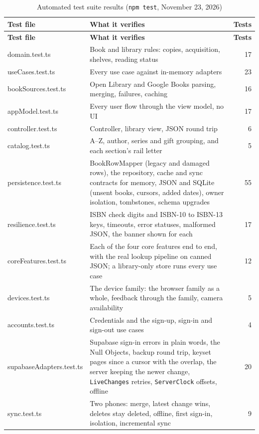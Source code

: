 \documentclass[12pt]{article}
\begin{document}
\begin{longtable}{L{5cm} L{8cm} r}
\caption{Automated test suite results (\texttt{npm test}, November 23, 2026)}
\label{tab:tests} \\
\toprule
\textbf{Test file} & \textbf{What it verifies} & \textbf{Tests} \\
\midrule
\endfirsthead
\toprule
\textbf{Test file} & \textbf{What it verifies} & \textbf{Tests} \\
\midrule
\endhead
domain.test.ts & Book and library rules: copies, acquisition, shelves, reading status & 17 \\
useCases.test.ts & Every use case against in-memory adapters & 23 \\
bookSources.test.ts & Open Library and Google Books parsing, merging, failures, caching & 16 \\
appModel.test.ts & Every user flow through the view model, no UI & 17 \\
controller.test.ts & Controller, library view, JSON round trip & 6 \\
catalog.test.ts & A--Z, author, series and gift grouping, and each section's rail letter & 5 \\
persistence.test.ts & BookRowMapper (legacy and damaged rows), the repository, cache and sync contracts for memory, JSON and SQLite (unsent books, cursors, added dates), owner isolation, tombstones, schema upgrades & 55 \\
resilience.test.ts & ISBN check digits and ISBN-10 to ISBN-13 keys, timeouts, error statuses, malformed JSON, the banner shown for each & 17 \\
coreFeatures.test.ts & Each of the four core features end to end, with the real lookup pipeline on canned JSON; a library-only store runs every use case & 12 \\
devices.test.ts & The device family: the browser family as a whole, feedback through the family, camera availability & 5 \\
accounts.test.ts & Credentials and the sign-up, sign-in and sign-out use cases & 4 \\
supabaseAdapters.test.ts & Supabase sign-in errors in plain words, the Null Objects, backup round trip, keyset pages since a cursor with the overlap, the server keeping the newer change, \texttt{LiveChanges} retries, \texttt{ServerClock} offsets, offline & 20 \\
sync.test.ts & Two phones: merge, latest change wins, deletes stay deleted, offline, first sign-in, isolation, incremental sync & 9 \\

\end{longtable}
\end{document}

